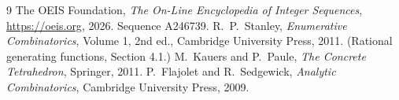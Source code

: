 \documentclass[11pt,a4paper]{article}
\theoremstyle{plain}
\theoremstyle{definition}
\begin{document}
\begin{thebibliography}{9}
 The OEIS Foundation, \emph{The On-Line Encyclopedia of Integer
Sequences}, \url{https://oeis.org}, 2026. Sequence A246739.
 R.~P.~Stanley, \emph{Enumerative Combinatorics}, Volume 1, 2nd ed.,
Cambridge University Press, 2011. (Rational generating functions, Section 4.1.)
 M.~Kauers and P.~Paule, \emph{The Concrete Tetrahedron}, Springer, 2011.
 P.~Flajolet and R.~Sedgewick, \emph{Analytic Combinatorics}, Cambridge
University Press, 2009.
\end{thebibliography}
\end{document}
